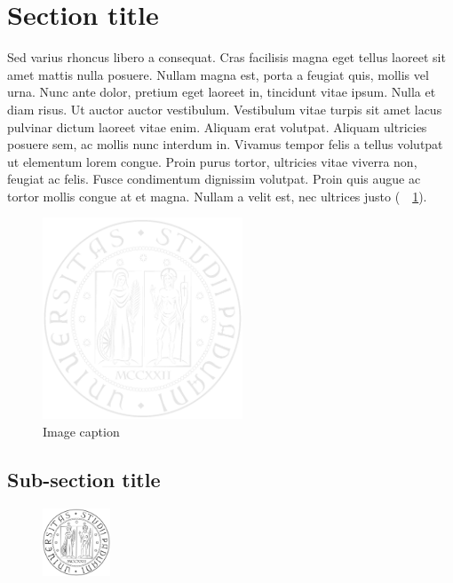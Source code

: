 \documentclass[a4paper, 12pt, twoside, openright]{book}
\begin{document}
\section{Section title}
Sed varius rhoncus libero a consequat. Cras facilisis magna eget tellus laoreet sit amet mattis nulla posuere. Nullam magna est, porta a feugiat quis, mollis vel urna. Nunc ante dolor, pretium eget laoreet in, tincidunt vitae ipsum. Nulla et diam risus. Ut auctor auctor vestibulum. Vestibulum vitae turpis sit amet lacus pulvinar dictum laoreet vitae enim. Aliquam erat volutpat. Aliquam ultricies posuere sem, ac mollis nunc interdum in. Vivamus tempor felis a tellus volutpat ut elementum lorem congue. Proin purus tortor, ultricies vitae viverra non, feugiat ac felis. Fusce condimentum dignissim volutpat. Proin quis augue ac tortor mollis congue at et magna. Nullam a velit est, nec ultrices justo (\seename\ \figurename~\ref{unipd-logo}).

\begin{figure}[ht]
  \centering
  \includegraphics[height=6cm]{images/unipd-light.png}
  \caption{Image caption}\label{unipd-logo}
\end{figure}

\subsection{Sub-section title}
\begin{figure}
  \vspace{-20pt}
  \begin{center}
  \includegraphics[width=2cm]{images/unipd-bn.png}
  \end{center}
  \vspace{-10pt}
\end{figure}
\end{document}
